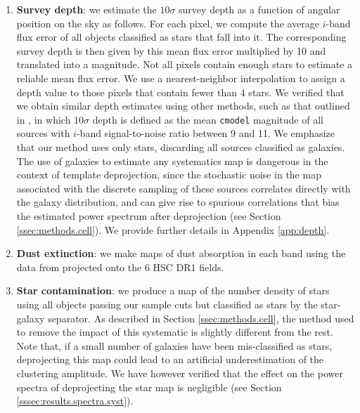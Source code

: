 \documentclass[a4paper,11pt]{article}
\begin{document}
    \begin{enumerate}
      \item {\bf Survey depth}: we estimate the $10\sigma$ survey depth as a function of angular position on the sky as follows. For each pixel, we compute the average $i$-band flux error of all objects classified as stars that fall into it. The corresponding survey depth is then given by this mean flux error multiplied by 10 and translated into a magnitude. Not all pixels contain enough stars to estimate a reliable mean flux error. We use a nearest-neighbor interpolation to assign a depth value to those pixels that contain fewer than 4 stars. We verified that we obtain similar depth estimates using other methods, such as that outlined in \cite{2018PASJ...70S..25M}, in which 10$\sigma$ depth is defined as the mean {\tt cmodel} magnitude of all sources with $i$-band signal-to-noise ratio between 9 and 11. We emphasize that our method uses only stars, discarding all sources classified as galaxies. The use of galaxies to estimate any systematics map is dangerous in the context of template deprojection, since the stochastic noise in the map associated with the discrete sampling of these sources correlates directly with the galaxy distribution, and can give rise to spurious correlations that bias the estimated power spectrum after deprojection (see Section \ref{ssec:methods.cell}). We provide further details in Appendix \ref{app:depth}.
      \item {\bf Dust extinction}: we make maps of dust absorption in each band using the data from \cite{1998ApJ...500..525S} projected onto the 6 HSC DR1 fields.
      \item {\bf Star contamination}: we produce a map of the number density of stars using all objects passing our sample cuts but classified as stars by the star-galaxy separator. As described in Section \ref{ssec:methods.cell}, the method used to remove the impact of this systematic is slightly different from the rest. Note that, if a small number of galaxies have been mis-classified as stars, deprojecting this map could lead to an artificial underestimation of the clustering amplitude. We have however verified that the effect on the power spectra of deprojecting the star map is negligible (see Section \ref{sssec:results.spectra.syst}).

\end{enumerate}
\end{document}
